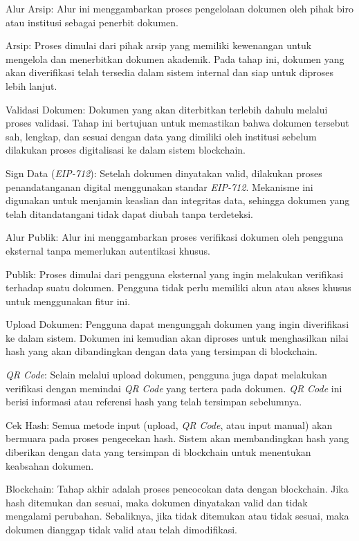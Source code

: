 		\begin{subsecenumerate}
			\item Alur Arsip: Alur ini menggambarkan proses pengelolaan dokumen oleh pihak biro atau institusi sebagai penerbit dokumen. 
			\begin{subsecenumerate}
				\item Arsip: Proses dimulai dari pihak arsip yang memiliki kewenangan untuk mengelola dan menerbitkan dokumen akademik. Pada tahap ini, dokumen yang akan diverifikasi telah tersedia dalam sistem internal dan siap untuk diproses lebih lanjut. 
				\item Validasi Dokumen: Dokumen yang akan diterbitkan terlebih dahulu melalui proses validasi. Tahap ini bertujuan untuk memastikan bahwa dokumen tersebut sah, lengkap, dan sesuai dengan data yang dimiliki oleh institusi sebelum dilakukan proses digitalisasi ke dalam sistem blockchain.
				\item Sign Data (\textit{EIP-712}): Setelah dokumen dinyatakan valid, dilakukan proses penandatanganan digital menggunakan standar \textit{EIP-712}. Mekanisme ini digunakan untuk menjamin keaslian dan integritas data, sehingga dokumen yang telah ditandatangani tidak dapat diubah tanpa terdeteksi.
			\end{subsecenumerate}
			\item Alur Publik: Alur ini menggambarkan proses verifikasi dokumen oleh pengguna eksternal tanpa memerlukan autentikasi khusus.
			\begin{subsecenumerate}
				\item Publik: Proses dimulai dari pengguna eksternal yang ingin melakukan verifikasi terhadap suatu dokumen. Pengguna tidak perlu memiliki akun atau akses khusus untuk menggunakan fitur ini.
				\item Upload Dokumen: Pengguna dapat mengunggah dokumen yang ingin diverifikasi ke dalam sistem. Dokumen ini kemudian akan diproses untuk menghasilkan nilai hash yang akan dibandingkan dengan data yang tersimpan di blockchain.
				\item \textit{QR Code}: Selain melalui upload dokumen, pengguna juga dapat melakukan verifikasi dengan memindai \textit{QR Code} yang tertera pada dokumen. \textit{QR Code} ini berisi informasi atau referensi hash yang telah 	tersimpan sebelumnya.
				\item Cek Hash: Semua metode input (upload, \textit{QR Code}, atau input manual) akan bermuara pada proses pengecekan hash. Sistem akan membandingkan hash yang diberikan dengan data yang tersimpan di blockchain untuk menentukan keabsahan dokumen.
				\item Blockchain: Tahap akhir adalah proses pencocokan data dengan blockchain. Jika hash ditemukan dan sesuai, maka dokumen dinyatakan valid dan tidak mengalami perubahan. Sebaliknya, jika tidak ditemukan atau tidak sesuai, maka dokumen dianggap tidak valid atau telah dimodifikasi.
			\end{subsecenumerate}

		\end{subsecenumerate}

